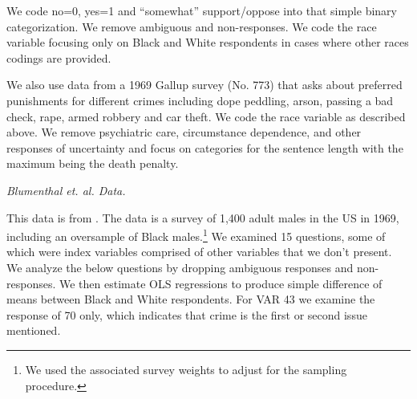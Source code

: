 \documentclass[12pt]{article}
\begin{document}
We code no=0, yes=1 and ``somewhat'' support/oppose into that simple binary categorization.  We remove ambiguous and non-responses.  We code the race variable focusing only on Black and White respondents in cases where other races codings are provided.

We also use data from a 1969 Gallup survey (No. 773) that asks about preferred punishments for different crimes including dope peddling, arson, passing a bad check, rape, armed robbery and car theft.  We code the race variable as described above.  We remove psychiatric care, circumstance dependence, and other responses of uncertainty and focus on categories for the sentence length with the maximum being the death penalty.




\vspace{.1in}
\emph{Blumenthal et. al. Data.}

This data is from .  The data is a survey of 1,400 adult males in the US in 1969, including an oversample of Black males.\footnote{We used the associated survey weights to adjust for the sampling procedure.}  We examined 15 questions, some of which were index variables comprised of other variables that we don't present.  We analyze the below questions by dropping ambiguous responses and non-responses.  We then estimate OLS regressions to produce simple difference of means between Black and White respondents.  For VAR 43 we examine the response of 70 only, which indicates that crime is the first or second issue mentioned.
\end{document}
